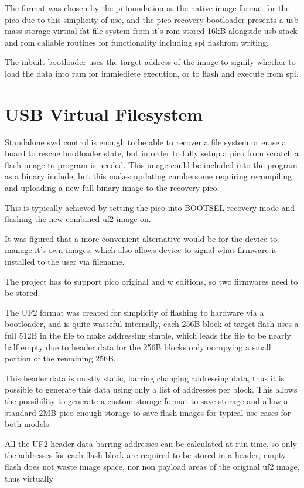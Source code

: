 The format was chosen by the pi foundation as the native image format for the pico due to this simplicity of use, and the pico recovery bootloader presents a \gls{usb} mass storage virtual \gls{fat} file system from it's \gls{rom} stored 16kB alongside \gls{usb} stack and \gls{rom} callable routines for functionality including \gls{spi} flashrom writing.

The inbuilt bootloader uses the target address of the image to signify whether to load the data into ram for immiediete execution, or to flash and execute from \gls{spi}.

\clearpage
\section{USB Virtual Filesystem}
Standalone \gls{swd} control is enough to be able to recover a file system or erase a board to rescue bootloader state, but in order to fully setup a pico from scratch a flash image to program is needed. This image could be included into the program as a binary include, but this makes updating cumbersome requiring recompiling and uploading a new full binary image to the recovery pico.

This is typically achieved by setting the pico into BOOTSEL recovery mode and flashing the new combined uf2 image on.

It was figured that a more convenient alternative would be for the device to manage it's own images, which also allows device to signal what firmware is installed to the user via filename.

The project has to support pico original and w editions, so two firmwares need to be stored.

The UF2 format was created for simplicity of flashing to hardware via a bootloader, and is quite wasteful internally, each 256B block of target flash uses a full 512B in the file to make addressing simple, which leads the file to be nearly half empty due to header data for the 256B blocks only occupying a small portion of the remaining 256B.

This header data is mostly static, barring changing addressing data, thus it is possible to generate this data using only a list of addresses per block. This allows the possibility to generate a custom storage format to save storage and allow a standard 2MB pico enough storage to save flash images for typical use cases for both models.

All the UF2 header data barring addresses can be calculated at run time, so only the addresses for each flash block are required to be stored in a header, empty flash does not waste image space, nor non payload areas of the original uf2 image, thus virtually

